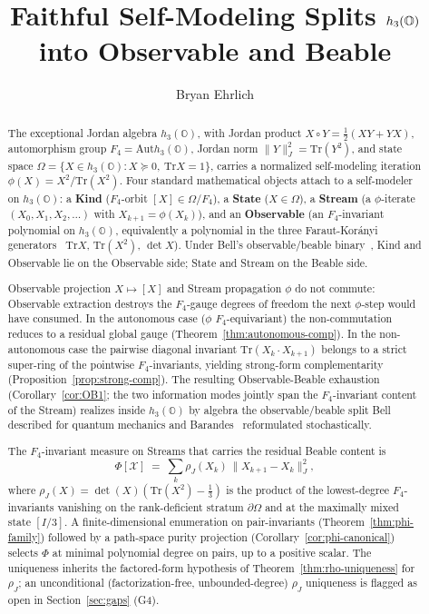\documentclass[12pt]{article}
\title{Faithful Self-Modeling Splits $\hthree$ into Observable and Beable}
\author{Bryan Ehrlich}
\date{}
\theoremstyle{remark}
\newcommand{\hthree}{h_3(\mathbb{O})}
\newcommand{\Ffour}{F_4}
\newcommand{\rhoJ}{\rho_J}
\newcommand{\Phiexp}{\Phi}
\newcommand{\Stream}{\mathcal{X}}
\newcommand{\Aut}{\mathrm{Aut}}
\newcommand{\Tr}{\mathrm{Tr}}
\newcommand{\Jnorm}[1]{\lVert #1 \rVert_J}
\begin{document}
\maketitle


\begin{abstract}
The exceptional Jordan algebra $\hthree$, with Jordan product
$X \circ Y = \tfrac{1}{2}(XY + YX)$, automorphism group
$\Ffour = \Aut\hthree$, Jordan norm $\Jnorm{Y}^2 = \Tr(Y^2)$, and
state space $\Omega = \{X \in \hthree : X \succeq 0,\ \Tr X = 1\}$,
carries a normalized self-modeling iteration $\phi(X) = X^2/\Tr(X^2)$.
Four standard mathematical objects attach to a self-modeler on
$\hthree$: a \textbf{Kind} ($\Ffour$-orbit $[X] \in \Omega/\Ffour$), a
\textbf{State} ($X \in \Omega$), a \textbf{Stream} (a $\phi$-iterate
$(X_0, X_1, X_2, \ldots)$ with $X_{k+1} = \phi(X_k)$), and an
\textbf{Observable} (an $\Ffour$-invariant polynomial on $\hthree$,
equivalently a polynomial in the three Faraut-Kor\'anyi
generators~\cite{faraut-koranyi1994} $\Tr X$, $\Tr(X^2)$, $\det X$).
Under Bell's observable/beable binary~\cite{bell1984speakable}, Kind
and Observable lie on the Observable side; State and Stream on the
Beable side.

Observable projection $X \mapsto [X]$ and Stream propagation $\phi$
do not commute: Observable extraction destroys the $\Ffour$-gauge
degrees of freedom the next $\phi$-step would have consumed. In the
autonomous case ($\phi$ $\Ffour$-equivariant) the non-commutation
reduces to a residual global gauge
(Theorem~\ref{thm:autonomous-comp}). In the non-autonomous case the
pairwise diagonal invariant $\Tr(X_k \cdot X_{k+1})$ belongs to a
strict super-ring of the pointwise $\Ffour$-invariants, yielding
strong-form complementarity (Proposition~\ref{prop:strong-comp}).
The resulting Observable-Beable exhaustion
(Corollary~\ref{cor:OB1}; the two information modes jointly span
the $\Ffour$-invariant content of the Stream) realizes inside
$\hthree$ by algebra the observable/beable split Bell described for
quantum mechanics and Barandes~\cite{barandes2023stochquantum}
reformulated stochastically.

The $\Ffour$-invariant measure on Streams that carries the residual
Beable content is
\[
  \Phiexp[\Stream] \;=\; \sum_k \rhoJ(X_k)\,\Jnorm{X_{k+1}-X_k}^2,
\]
where $\rhoJ(X) = \det(X)(\Tr(X^2) - \tfrac{1}{3})$ is the product
of the lowest-degree $\Ffour$-invariants vanishing on the
rank-deficient stratum $\partial\Omega$ and at the maximally mixed
state $[I/3]$. A finite-dimensional enumeration on pair-invariants
(Theorem~\ref{thm:phi-family}) followed by a path-space purity
projection (Corollary~\ref{cor:phi-canonical}) selects $\Phiexp$
at minimal polynomial degree on pairs, up to a positive scalar.
The uniqueness inherits the factored-form hypothesis of
Theorem~\ref{thm:rho-uniqueness} for $\rhoJ$; an unconditional
(factorization-free, unbounded-degree) $\rhoJ$ uniqueness is
flagged as open in Section~\ref{sec:gaps} (G4).
\end{abstract}
\end{document}
